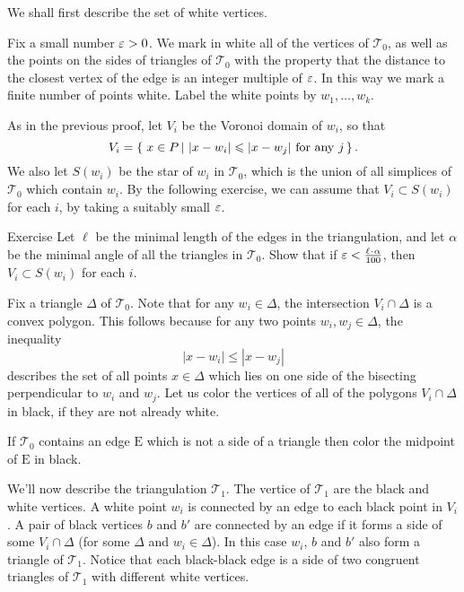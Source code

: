 We shall first describe the set of white vertices.

Fix a small number $\varepsilon>0$.
We mark in white all of the vertices of $\mathcal{T}_0$,
as well as the points on the sides of triangles of $\mathcal{T}_0$ 
with the property that the distance to the closest vertex of the edge is an integer multiple of $\varepsilon$.
In this way we mark a finite number of points white.
Label the white points by $w_1,\dots,w_k$.

As in the previous proof, let $V_i$ be the Voronoi domain of $w_i$, so that
\[V_i=\set{x\in P}{|x-w_i|\le|x-w_j|\ \text{for any}\ j}.\]
We also let $S(w_i)$ be the star of $w_i$ in $\mathcal{T}_0$, which is the union of all simplices of $\mathcal{T}_0$ which contain $w_i$.
By the following exercise, we can assume that $V_i\subset S(w_i)$ for each $i$, by taking a suitably small $\varepsilon$.


\begin{thm}{Exercise}\label{ex:voronoi-in-star}
Let $\ell$ be the minimal length of the edges in the triangulation,
and let $\alpha$ be the minimal angle of all the triangles in $\mathcal{T}_0$.
Show that if $\eps<\tfrac{\ell\cdot \alpha}{100}$, 
then $V_i\subset S(w_i)$ for each $i$.
\end{thm}



Fix a triangle $\Delta$ of $\mathcal{T}_0$.
Note that for any $w_i\in \Delta$, the intersection $V_i\cap \Delta$ is a convex polygon.
This follows because for any two points $w_i,w_j\in\Delta$,
the inequality 
$$|x-w_i|\le |x-w_j|$$ 
describes the set of all points $x \in \Delta$
which lies on one side of the bisecting perpendicular to $w_i$ and $w_j$.
Let us color the vertices of all of the polygons $V_i\cap \Delta$ in black, if they are not already white.

If $\mathcal{T}_0$ contains an edge $\mathrm{E}$ which is not 
a side of a triangle then color the midpoint of $\mathrm{E}$ in black.  

We'll now describe the triangulation $\mathcal{T}_1$.  The vertice of $\mathcal{T}_1$ are the black and white vertices.
A white point $w_i$ is connected by an edge to each black point in $V_i$.
A pair of black vertices $b$ and $b'$ are connected by an edge if it forms a side of some $V_i\cap \Delta$ 
(for some $\Delta$ and $w_i\in\Delta$).
In this case $w_i$, $b$ and $b'$ also form a triangle of $\mathcal{T}_1$.  Notice that each black-black edge is a side of two congruent triangles of $\mathcal{T}_1$ with different white vertices.

